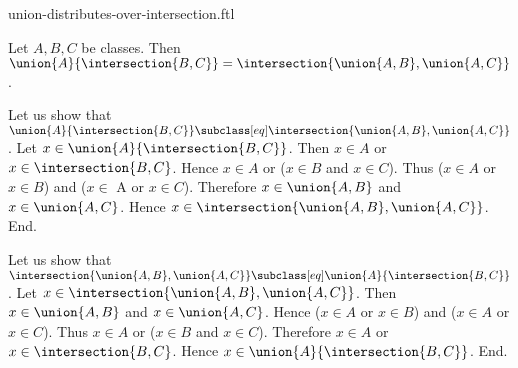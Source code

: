 \documentclass{article}
\begin{document}
\begin{smodule}[creators={Marcel Schütz}]{union-distributes-over-intersection.ftl}

  \begin{fproposition*}[label=5609225394847744]
    Let $A, B, C$ be classes.
    Then $\union{A}{\intersection{B,C}} = \intersection{\union{A,B},\union{A,C}}$.
  \end{fproposition*}
  \begin{fproof}
    Let us show that $\union{A}{\intersection{B,C}} \subclass[eq] \intersection{\union{A,B},\union{A,C}}$.
      Let $x \in \union{A}{\intersection{B,C}}$.
      Then $x \in A$ or $x \in \intersection{B,C}$.
      Hence $x \in A$ or ($x \in B$ and $x \in C$).
      Thus ($x \in A$ or $x \in B$) and ($x \in$ A or $x \in C$).
      Therefore $x \in \union{A,B}$ and $x \in \union{A,C}$.
      Hence $x \in \intersection{\union{A,B},\union{A,C}}$.
    End.

    Let us show that $\intersection{\union{A,B},\union{A,C}} \subclass[eq] \union{A}{\intersection{B,C}}$.
      Let $x \in \intersection{\union{A,B},\union{A,C}}$.
      Then $x \in \union{A,B}$ and $x \in \union{A,C}$.
      Hence ($x \in A$ or $x \in B$) and ($x \in A$ or $x \in C$).
      Thus $x \in A$ or ($x \in B$ and $x \in C$).
      Therefore $x \in A$ or $x \in \intersection{B,C}$.
      Hence $x \in \union{A}{\intersection{B,C}}$.
    End.
  \end{fproof}
\end{smodule}
\end{document}
